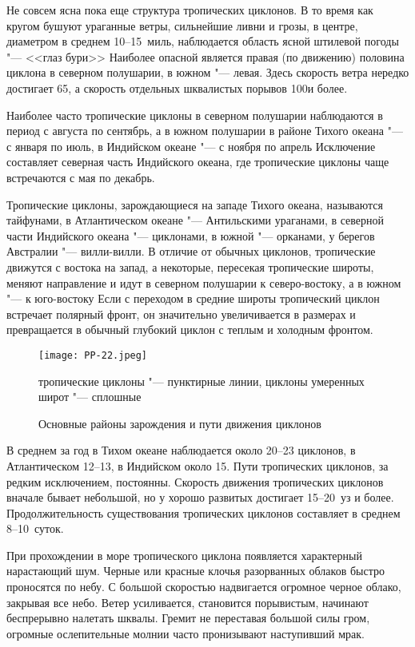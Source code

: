 Не совсем ясна пока еще структура тропических циклонов. В то время как
кругом бушуют ураганные ветры, сильнейшие ливни и грозы, в центре,
диаметром в среднем 10--15~миль, наблюдается область ясной штилевой
погоды "--- <<глаз бури>> Наиболее опасной является правая (по движению)
половина циклона в северном полушарии, в южном "--- левая. Здесь скорость
ветра нередко достигает 65\speedms, а скорость отдельных шквалистых
порывов 100\speedms и более.

Наиболее часто тропические циклоны в северном полушарии наблюдаются в
период с августа по сентябрь, а в южном полушарии в районе Тихого
океана "--- с января по июль, в Индийском океане "--- с ноября по апрель
Исключение составляет северная часть Индийского океана, где
тропические циклоны чаще встречаются с мая по декабрь.

Тропические циклоны, зарождающиеся на западе Тихого океана, называются
тайфунами, в Атлантическом океане "--- Антильскими ураганами, в северной
части Индийского океана "--- циклонами, в южной "--- орканами, у берегов
Австралии "--- вилли-вилли. В отличие от обычных циклонов, тропические
движутся с востока на запад, а некоторые, пересекая тропические
широты, меняют направление и идут в северном полушарии к
северо-востоку, а в южном "--- к юго-востоку Если с переходом в средние
широты тропический циклон встречает полярный фронт, он значительно
увеличивается в размерах и превращается в обычный глубокий циклон с
теплым и холодным фронтом.

\begin{figure}[htb]
  \centering{}
  \texttt{[image: PP-22.jpeg]}
  \caption{Основные районы зарождения и пути движения циклонов}
  \label{fig:pp22}
  \small
  \centering{}
  тропические циклоны "--- пунктирные линии, циклоны умеренных широт "--- сплошные
\end{figure}

В среднем за год в Тихом океане наблюдается около 20--23 циклонов, в
Атлантическом 12--13, в Индийском около 15. Пути тропических циклонов,
за редким исключением, постоянны. Скорость движения тропических
циклонов вначале бывает небольшой, но у хорошо развитых достигает
15--20~уз и более. Продолжительность существования тропических циклонов
составляет в среднем 8--10~суток.

При прохождении в море тропического циклона появляется характерный
нарастающий шум. Черные или красные клочья разорванных облаков быстро
проносятся по небу. С большой скоростью надвигается огромное черное
облако, закрывая все небо. Ветер усиливается, становится порывистым,
начинают беспрерывно налетать шквалы. Гремит не переставая большой
силы гром, огромные ослепительные молнии часто пронизывают наступивший
мрак.

